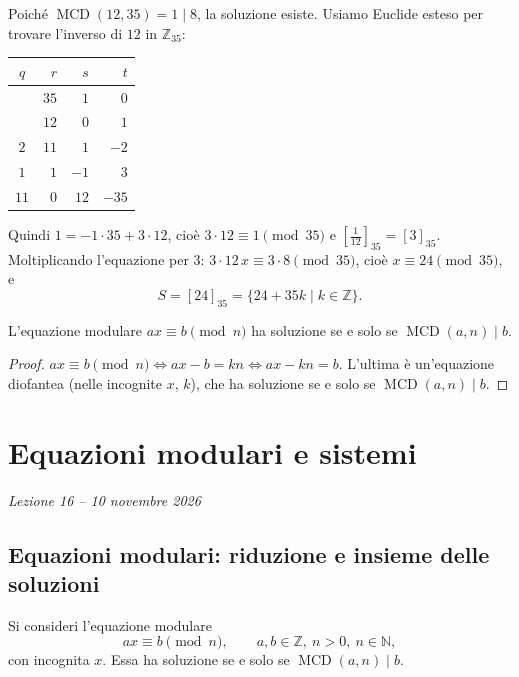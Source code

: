 \documentclass[11pt,a4paper]{article}
\begin{document}
\begin{esempio}
Poiché $\operatorname{MCD}(12, 35) = 1 \mid 8$, la soluzione esiste. Usiamo Euclide esteso per trovare l'inverso di $12$ in $\mathbb{Z}_{35}$:
\begin{center}
\begin{tabular}{c|r|r|r}
$q$ & $r$ & $s$ & $t$ \\
\midrule
 & $35$ & $1$ & $0$ \\
 & $12$ & $0$ & $1$ \\
$2$ & $11$ & $1$ & $-2$ \\
$1$ & $1$ & $-1$ & $3$ \\
$11$ & $0$ & $12$ & $-35$ \\
\end{tabular}
\end{center}
Quindi $1 = -1\cdot 35 + 3\cdot 12$, cioè $3\cdot 12 \equiv 1 \pmod{35}$ e $\left[\tfrac{1}{12}\right]_{35} = [3]_{35}$. Moltiplicando l'equazione per $3$: $3\cdot 12\,x \equiv 3\cdot 8 \pmod{35}$, cioè $x \equiv 24 \pmod{35}$, e
\[
  S = [24]_{35} = \{24 + 35k \mid k \in \mathbb{Z}\}.
\]
\end{esempio}

\begin{proposizione}
L'equazione modulare $ax \equiv b \pmod n$ ha soluzione se e solo se $\operatorname{MCD}(a, n) \mid b$.
\end{proposizione}

\begin{proof}
$ax \equiv b \pmod n \iff ax - b = kn \iff ax - kn = b$. L'ultima è un'equazione diofantea (nelle incognite $x$, $k$), che ha soluzione se e solo se $\operatorname{MCD}(a, n) \mid b$.
\end{proof}

\section[Equazioni modulari e sistemi (Lezione 16 -- 10 novembre 2026)]{Equazioni modulari e sistemi}
\noindent\emph{Lezione 16 -- 10 novembre 2026}

\subsection{Equazioni modulari: riduzione e insieme delle soluzioni}

Si consideri l'equazione modulare
\[
  ax \equiv b \pmod n, \qquad a, b \in \mathbb{Z},\ n > 0,\ n \in \mathbb{N},
\]
con incognita $x$. Essa ha soluzione se e solo se $\operatorname{MCD}(a, n) \mid b$.
\end{document}
